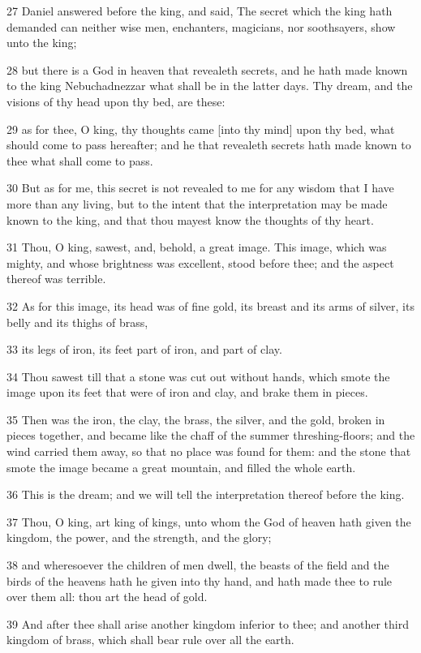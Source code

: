 \par 27 Daniel answered before the king, and said, The secret which the king hath demanded can neither wise men, enchanters, magicians, nor soothsayers, show unto the king;
\par 28 but there is a God in heaven that revealeth secrets, and he hath made known to the king Nebuchadnezzar what shall be in the latter days. Thy dream, and the visions of thy head upon thy bed, are these:
\par 29 as for thee, O king, thy thoughts came [into thy mind] upon thy bed, what should come to pass hereafter; and he that revealeth secrets hath made known to thee what shall come to pass.
\par 30 But as for me, this secret is not revealed to me for any wisdom that I have more than any living, but to the intent that the interpretation may be made known to the king, and that thou mayest know the thoughts of thy heart.
\par 31 Thou, O king, sawest, and, behold, a great image. This image, which was mighty, and whose brightness was excellent, stood before thee; and the aspect thereof was terrible.
\par 32 As for this image, its head was of fine gold, its breast and its arms of silver, its belly and its thighs of brass,
\par 33 its legs of iron, its feet part of iron, and part of clay.
\par 34 Thou sawest till that a stone was cut out without hands, which smote the image upon its feet that were of iron and clay, and brake them in pieces.
\par 35 Then was the iron, the clay, the brass, the silver, and the gold, broken in pieces together, and became like the chaff of the summer threshing-floors; and the wind carried them away, so that no place was found for them: and the stone that smote the image became a great mountain, and filled the whole earth.
\par 36 This is the dream; and we will tell the interpretation thereof before the king.
\par 37 Thou, O king, art king of kings, unto whom the God of heaven hath given the kingdom, the power, and the strength, and the glory;
\par 38 and wheresoever the children of men dwell, the beasts of the field and the birds of the heavens hath he given into thy hand, and hath made thee to rule over them all: thou art the head of gold.
\par 39 And after thee shall arise another kingdom inferior to thee; and another third kingdom of brass, which shall bear rule over all the earth.
